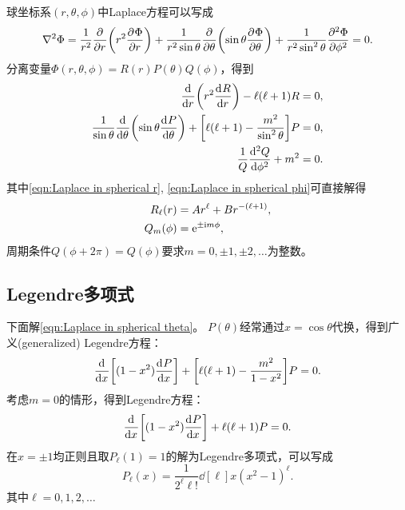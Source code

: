 球坐标系$(r,\theta,\phi)$中Laplace方程可以写成
\begin{equation}
    \label{eqn:Laplace in spherical}
    \laplacian\Phi = \frac1{r^2}\pp r\biggp{r^2\pv\Phi r} + \frac1{r^2\sin\theta}\pp\theta\biggp{\sin\theta\pv\Phi\theta} + \frac1{r^2\sin^2\theta}\pv[2]\Phi\phi = 0.
\end{equation}
分离变量$\Phi(r,\theta,\phi) = R(r)P(\theta)Q(\phi)$，得到
\begin{subequations}
    \begin{align}
        \label{eqn:Laplace in spherical r}
        \dd r\biggp{r^2\dv Rr} - \ell(\ell + 1)R &= 0,\\
        \label{eqn:Laplace in spherical theta}
        \frac1{\sin\theta}\dd\theta\biggp{\sin\theta\dv P\theta} + \biggb{\ell(\ell + 1) - \frac{m^2}{\sin^2\theta}}P &= 0,\\
        \label{eqn:Laplace in spherical phi}
        \frac1Q\dv[2]Q\phi + m^2 &= 0.
    \end{align}
\end{subequations}
其中\eqref{eqn:Laplace in spherical r}, \eqref{eqn:Laplace in spherical phi}可直接解得
\begin{subequations}
    \begin{align}
        R_\ell(r) &= Ar^\ell + Br^{-(\ell+1)},\\
        Q_m(\phi) &= \e^{\pm\i m\phi},
    \end{align}
\end{subequations}
周期条件$Q(\phi + 2\pi) = Q(\phi)$要求$m = 0,\pm1,\pm2,\ldots$为整数。

\subsection{Legendre多项式}
\label{ssec:Legendre polynomial}

下面解\eqref{eqn:Laplace in spherical theta}。
$P(\theta)$经常通过$x = \cos\theta$代换，得到广义(generalized) Legendre方程：
\begin{equation}
    \label{eqn:general Legendre}
    \dd x\biggb{(1 - x^2)\dv Px} + \biggb{\ell(\ell + 1) - \frac{m^2}{1 - x^2}}P = 0.
\end{equation}
考虑$m = 0$的情形，得到Legendre方程：
\begin{equation}
    \label{eqn:Legendre}
    \dd x\biggb{(1 - x^2)\dv Px} + \ell(\ell + 1)P = 0.
\end{equation}
在$x = \pm1$均正则且取$P_\ell(1) = 1$的解为Legendre多项式，可以写成
\begin{equation}
    \label{eqn:Rodrigues}
    P_\ell(x) = \frac1{2^\ell\ell!}\dd[\ell]x(x^2 - 1)^\ell.
\end{equation}
其中$\ell = 0,1,2,\ldots$

